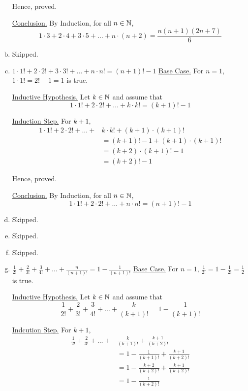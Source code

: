 \begin{enumerate}[(a).]
		Hence, proved.
		
		\underline{Conclusion.} By Induction, for all $n \in \mathbb{N}$,
		$$1 \cdot 3 + 2 \cdot 4 + 3 \cdot 5 + \ldots + n \cdot (n+2) = \frac{n(n+1)(2n+7)}{6}$$
		\es

	\item Skipped.

	\item $1 \cdot 1! + 2 \cdot 2! + 3 \cdot 3! + \ldots + n \cdot n! = (n+1)! - 1$
		\bs
		\underline{Base Case.} For $n = 1$, $1 \cdot 1! = 2! - 1 = 1$ is true.

		\underline{Inductive Hypothesis.} Let $k \in \mathbb{N}$ and assume that 
		$$1 \cdot 1! + 2 \cdot 2! + \ldots + k \cdot k! = (k+1)! - 1$$

		\underline{Induction Step.} For $k+1$,
		\begin{align*}
			1 \cdot 1! + 2 \cdot 2! + \ldots + & k \cdot k! + (k+1) \cdot (k+1)! \\
				&= (k+1)! - 1 + (k+1) \cdot (k+1)! \\
				&= (k+2) \cdot (k+1)! - 1 \\
				&= (k+2)! - 1
		\end{align*}

		Hence, proved.
		
		\underline{Conclusion.} By Induction, for all $n \in \mathbb{N}$,
		$$1 \cdot 1! + 2 \cdot 2! + \ldots + n \cdot n! = (n+1)! - 1$$
		\es
		
	\item Skipped.

	\item Skipped.
	
	\item Skipped.

	\item $\displaystyle \frac{1}{2!} + \frac{2}{3!} + \frac{3}{4!} + \ldots + \frac{n}{(n+1)!} = 1 - \frac{1}{(n+1)!}$
		\bs 
		\underline{Base Case.} For $n = 1$, $\frac{1}{2!} = 1 - \frac{1}{2!} = \frac{1}{2}$ is true.

		\underline{Inductive Hypothesis.} Let $k \in \mathbb{N}$ and assume that 
		$$\frac{1}{2!} + \frac{2}{3!} + \frac{3}{4!} + \ldots + \frac{k}{(k+1)!} = 1 - \frac{1}{(k+1)!}$$
		
		\underline{Indcution Step.} For $k+1$,
		\begin{align*}
			\frac{1}{2!} + \frac{2}{3!} + \ldots + &\frac{k}{(k+1)!} + \frac{k+1}{(k+2)!} \\
				&= 1 - \frac{1}{(k+1)!} + \frac{k+1}{(k+2)!} \\
				&= 1 - \frac{k+2}{(k+2)!} + \frac{k+1}{(k+2)!} \\
				&= 1 - \frac{1}{(k+2)!}
		\end{align*}


\end{enumerate}
